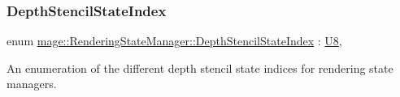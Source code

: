 \hypertarget{classmage_1_1_rendering_state_manager_a7a8ab9ab2d4eb992a364d09c9eec636a}{}\label{classmage_1_1_rendering_state_manager_a7a8ab9ab2d4eb992a364d09c9eec636a} 
\subsubsection{\texorpdfstring{Depth\+Stencil\+State\+Index}{DepthStencilStateIndex}}
{\footnotesize\ttfamily enum \hyperlink{classmage_1_1_rendering_state_manager_a7a8ab9ab2d4eb992a364d09c9eec636a}{mage\+::\+Rendering\+State\+Manager\+::\+Depth\+Stencil\+State\+Index} \+: \hyperlink{namespacemage_afc638980bc6154f15af5e2d93a0e0ea9}{U8}\hspace{0.3cm}{\ttfamily [strong]}, {\ttfamily [private]}}

An enumeration of the different depth stencil state indices for rendering state managers.

